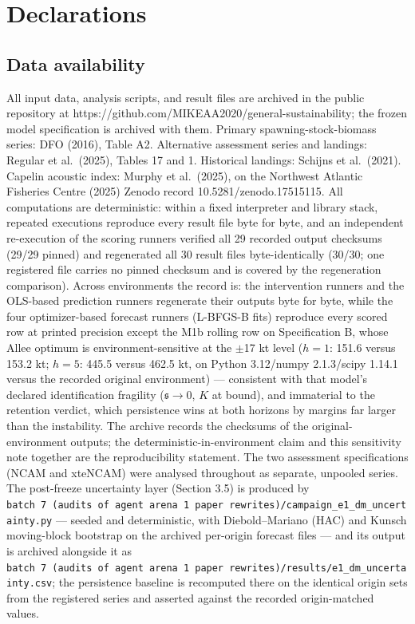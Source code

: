 \documentclass[11pt]{article}
\begin{document}
\section*{Declarations}

\subsection*{Data availability}

All input data, analysis scripts, and result files are archived in the
public repository at
https://github.com/MIKEAA2020/general-sustainability; the frozen model
specification is archived with them. Primary spawning-stock-biomass
series: DFO (2016), Table A2. Alternative assessment series and
landings: Regular et al.~(2025), Tables 17 and 1. Historical landings:
Schijns et al.~(2021). Capelin acoustic index: Murphy et al.~(2025), on
the Northwest Atlantic Fisheries Centre (2025) Zenodo record
10.5281/zenodo.17515115. All computations are deterministic: within a
fixed interpreter and library stack, repeated executions reproduce every
result file byte for byte, and an independent re-execution of the
scoring runners verified all 29 recorded output checksums (29/29 pinned)
and regenerated all 30 result files byte-identically (30/30; one
registered file carries no pinned checksum and is covered by the
regeneration comparison). Across environments the record is: the
intervention runners and the OLS-based prediction runners regenerate
their outputs byte for byte, while the four optimizer-based forecast
runners (L-BFGS-B fits) reproduce every scored row at printed precision
except the M1b rolling row on Specification B, whose Allee optimum is
environment-sensitive at the \ensuremath{\pm}17 kt level (\(h=1\): 151.6 versus 153.2
kt; \(h=5\): 445.5 versus 462.5 kt, on Python 3.12/numpy 2.1.3/scipy
1.14.1 versus the recorded original environment) --- consistent with
that model's declared identification fragility (\(\mathfrak s\to 0\),
\(K\) at bound), and immaterial to the retention verdict, which
persistence wins at both horizons by margins far larger than the
instability. The archive records the checksums of the
original-environment outputs; the deterministic-in-environment claim and
this sensitivity note together are the reproducibility statement. The
two assessment specifications (NCAM and xteNCAM) were analysed
throughout as separate, unpooled series. The post-freeze uncertainty
layer (Section 3.5) is produced by
\texttt{batch\ 7\ (audits\ of\ agent\ arena\ 1\ paper\ rewrites)/campaign\_e1\_dm\_uncertainty.py}
--- seeded and deterministic, with Diebold--Mariano (HAC) and Kunsch
moving-block bootstrap on the archived per-origin forecast files --- and
its output is archived alongside it as
\texttt{batch\ 7\ (audits\ of\ agent\ arena\ 1\ paper\ rewrites)/results/e1\_dm\_uncertainty.csv};
the persistence baseline is recomputed there on the identical origin
sets from the registered series and asserted against the recorded
origin-matched values.
\end{document}
